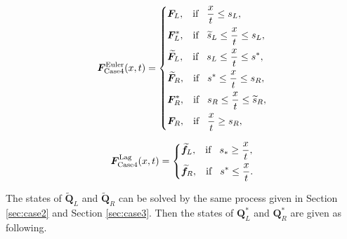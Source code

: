 \documentclass{article}
\numberwithin{equation}{section}
\numberwithin{table}{section}
\begin{document}
 \begin{equation}\label{eq:HLLCEP}
   \bm{F}^{\text{Euler}}_{\text{Case4}}(x,t) = \left\{ \begin{aligned}
		& \bm{F}_L, \hspace{0.3cm} \text{if} \hspace{0.3cm} \frac{x}{t}\le s_L, \\
		& \bm{F}_L^*, \hspace{0.3cm} \text{if} \hspace{0.3cm} \widetilde{s}_L\le \frac{x}{t} \le s_L, \\
		& \widetilde{\bm{F}}_L, \hspace{0.3cm} \text{if} \hspace{0.3cm} s_L\le \frac{x}{t} \le s^*, \\
		& \widetilde{\bm{F}}_R, \hspace{0.3cm} \text{if} \hspace{0.3cm} s^*\le \frac{x}{t} \le s_R, \\
		& \bm{F}_R^*, \hspace{0.3cm} \text{if} \hspace{0.3cm} s_R\le \frac{x}{t} \le\widetilde{ s}_R,\\
		& \bm{F}_R, \hspace{0.3cm} \text{if} \hspace{0.3cm} \frac{x}{t}\ge s_R, \\
	  \end{aligned}
	\right.
  \end{equation}

\begin{equation}
\bm{F}^{\text{Lag}}_{\text{Case4}}(x,t) = \left\{ \begin{aligned}
		& \widetilde{\bm{f}}_L, \hspace{0.3cm} \text{if} \hspace{0.3cm} s_*\ge \frac{x}{t},\\
		& \widetilde{\bm{f}}_R, \hspace{0.3cm} \text{if} \hspace{0.3cm} s^*\le \frac{x}{t}.\\
	  \end{aligned}
	\right.
  \end{equation}

The states of $\widetilde{\bm{Q}}_L$ and   $\widetilde{\bm{Q}}_R$ can be solved by  the same process  given in  Section \ref{sec:case2} and Section \ref{sec:case3}. Then the states of $\bm{Q}^*_L$ and $\bm{Q}^*_R$ are given as following.
\end{document}
